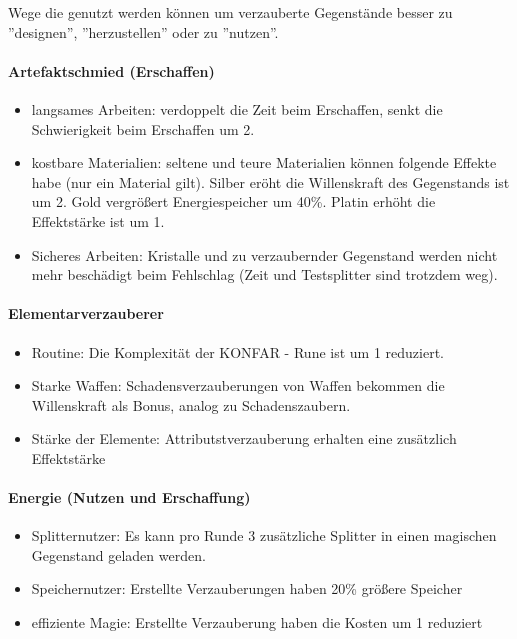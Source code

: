 \documentclass{article}
\begin{document}
Wege die genutzt werden können um verzauberte Gegenstände besser zu ''designen'', ''herzustellen'' oder zu ''nutzen''.

\paragraph{Artefaktschmied (Erschaffen)}

\begin{itemize}
\item langsames Arbeiten: verdoppelt die Zeit beim Erschaffen, senkt die Schwierigkeit beim Erschaffen um 2.
\item kostbare Materialien: seltene und teure Materialien können folgende Effekte habe (nur ein Material gilt). Silber eröht die Willenskraft des Gegenstands ist um 2. Gold vergrößert Energiespeicher um 40\%. Platin erhöht die Effektstärke ist um 1.
\item Sicheres Arbeiten: Kristalle und zu verzaubernder Gegenstand werden nicht mehr beschädigt beim Fehlschlag (Zeit und Testsplitter sind trotzdem weg).
\end{itemize}

\paragraph{Elementarverzauberer}

\begin{itemize}
\item Routine: Die Komplexität der KONFAR - Rune ist um 1 reduziert.
\item Starke Waffen: Schadensverzauberungen von Waffen bekommen die Willenskraft als Bonus, analog zu Schadenszaubern.
\item Stärke der Elemente: Attributstverzauberung erhalten eine zusätzlich Effektstärke
\end{itemize}

\paragraph{Energie (Nutzen und Erschaffung)}

\begin{itemize}
\item Splitternutzer: Es kann pro Runde 3 zusätzliche Splitter in einen magischen Gegenstand geladen werden.
\item Speichernutzer: Erstellte Verzauberungen haben 20\% größere Speicher
\item effiziente Magie: Erstellte Verzauberung haben die Kosten um 1 reduziert
\end{itemize}
\end{document}
